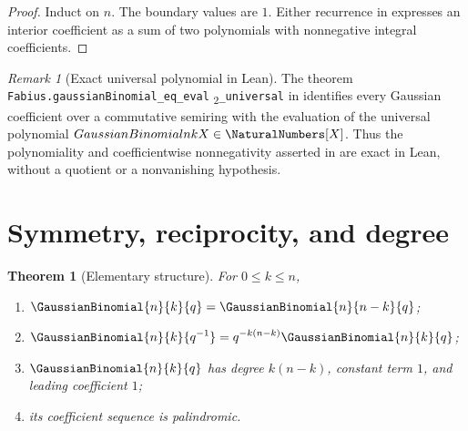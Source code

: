 \documentclass[11pt,a4paper,oneside,openany]{book}
\newtheorem{theorem}{Theorem}[chapter]
\theoremstyle{definition}
\theoremstyle{remark}
\newtheorem{remark}[remark]{Remark}
\newcommand{\statusexact}{\textsf{\color{statusgreen}exact}}
\begin{document}
\begin{proof}
Induct on $n$.  The boundary values are $1$.  Either recurrence in  expresses an interior coefficient as a sum of two polynomials with nonnegative integral coefficients.
\end{proof}

\begin{remark}[Exact universal polynomial in Lean]
The theorem
\texttt{Fabius.gaussianBinomial\_\allowbreak{}eq\_\allowbreak{}eval}%
\textsubscript{2}\allowbreak{}\texttt{\_universal} in
 identifies every Gaussian coefficient
over a commutative semiring with the evaluation of the universal polynomial
\(GaussianBinomial{n}{k}{X}\in\NaturalNumbers[X]\).  Thus the polynomiality
and coefficientwise nonnegativity asserted in  are
\statusexact{} in Lean, without a quotient or a nonvanishing hypothesis.
\end{remark}

\section{Symmetry, reciprocity, and degree}

\begin{theorem}[Elementary structure]\label{thm:qbinom-structure}
For $0\le k\le n$,
\begin{enumerate}[label=\textup{(\roman*)}]
\item $\GaussianBinomial{n}{k}{q}=\GaussianBinomial{n}{n-k}{q}$;
\item $\displaystyle \GaussianBinomial{n}{k}{q^{-1}}=q^{-k(n-k)}\GaussianBinomial{n}{k}{q}$;
\item $\GaussianBinomial{n}{k}{q}$ has degree $k(n-k)$, constant term $1$, and leading coefficient $1$;
\item its coefficient sequence is palindromic.
\end{enumerate}
\end{theorem}
\end{document}
